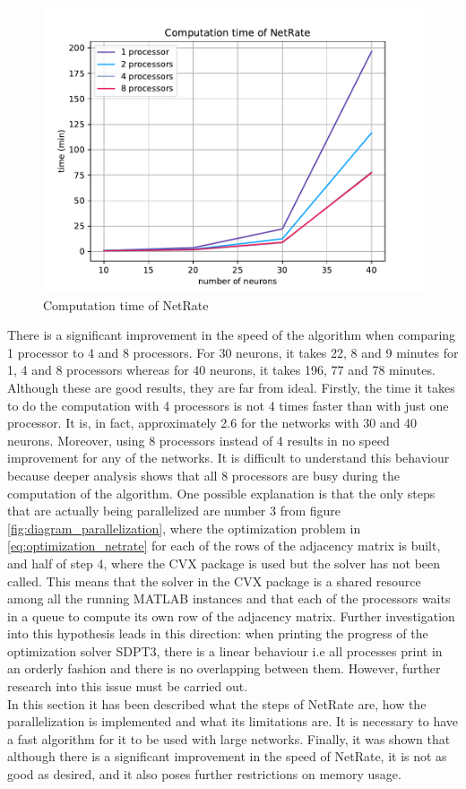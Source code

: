 \begin{figure}
\centering
\includegraphics[width=0.8\linewidth]{computation_time_netrate.pdf}
\caption{Computation time of NetRate}
\label{fig:speed_netrate}
\end{figure}

There is a significant improvement in the speed of the algorithm when comparing 1 processor to 4 and 8 processors. For 30 neurons, it takes 22, 8 and 9 minutes for 1, 4 and 8 processors whereas for 40 neurons, it takes 196, 77 and 78 minutes. Although these are good results, they are far from ideal. 
Firstly, the time it takes to do the computation with 4 processors is not 4 times faster than with just one processor. It is, in fact, approximately 2.6 for the networks with 30 and 40 neurons. 
Moreover, using 8 processors instead of 4 results in no speed improvement for any of the networks. It is difficult to understand this behaviour because deeper analysis shows that all 8 processors are busy during the computation of the algorithm. One possible explanation is that the only steps that are actually being parallelized are number 3 from figure \ref{fig:diagram_parallelization}, where the optimization problem in \ref{eq:optimization_netrate} for each of the rows of the adjacency matrix is built, and half of step 4, where the CVX package is used but the solver has not been called. This means that the solver in the CVX package is a shared resource among all the running MATLAB instances and that each of the processors waits in a queue to compute its own row of the adjacency matrix. Further investigation into this hypothesis leads in this direction: when printing the progress of the optimization solver SDPT3, there is a linear behaviour i.e all processes print in an orderly fashion and there is no overlapping between them. However, further research into this issue must be carried out.\\

In this section it has been described what the steps of NetRate are, how the parallelization is implemented and what its limitations are. It is necessary to have a fast algorithm for it to be used with large networks. Finally, it was shown that although there is a significant improvement in the speed of NetRate, it is not as good as desired, and it also poses further restrictions on memory usage.  
